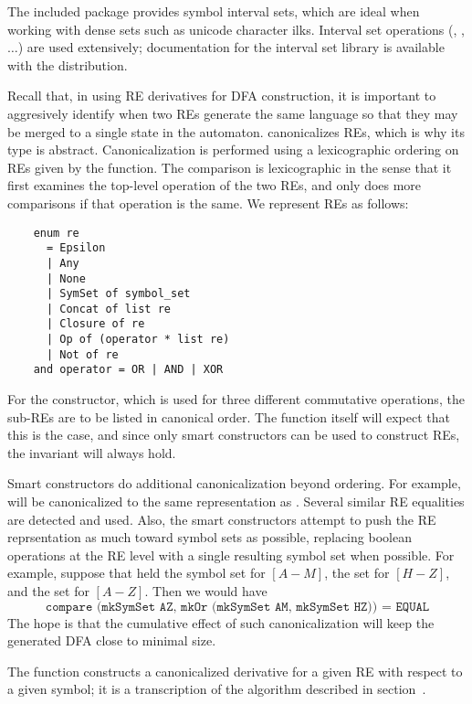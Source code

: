 The included package  provides symbol interval sets, which are
ideal when working with dense sets such as unicode character ilks.  Interval
set operations (, , $\dots$) are used extensively;
documentation for the interval set library is available with the
distribution.

Recall that, in using RE derivatives for DFA construction, it is
important to aggresively identify when two REs generate the same
language so that they may be merged to a single state in the automaton.
 canonicalizes REs, which is why its  type is abstract.
Canonicalization is performed using a lexicographic ordering on REs given by the
 function.  The comparison is lexicographic in the sense that it
first examines the top-level operation of the two REs, and only does more
comparisons if that operation is the same.  We represent REs as follows:
\begin{verbatim}
    enum re
      = Epsilon
      | Any
      | None
      | SymSet of symbol_set
      | Concat of list re
      | Closure of re
      | Op of (operator * list re)
      | Not of re
    and operator = OR | AND | XOR
\end{verbatim}
For the  constructor, which is used for three different commutative
operations, the sub-REs are to be listed in canonical order. The 
function itself will expect that this is the case, and since only smart
constructors can be used to construct REs, the invariant will always hold.

Smart constructors do additional canonicalization beyond ordering.  For
example,  will be canonicalized
to the same representation as .  Several similar RE equalities
are detected and used.  Also, the smart constructors attempt to push the RE
reprsentation as much toward symbol sets as possible, replacing boolean
operations at the RE level with a single resulting symbol set when possible.
For example, suppose that  held the symbol set for $[A-M]$,  the
set for $[H-Z]$, and  the set for $[A-Z]$. Then we would have
\[
\texttt{compare (mkSymSet AZ, mkOr (mkSymSet AM, mkSymSet HZ)) = EQUAL}
\]
The hope is that the cumulative effect of such canonicalization will keep the
generated DFA close to minimal size.

The  function constructs a canonicalized derivative for a given
RE with respect to a given symbol; it is a transcription of the algorithm
described in section~.

